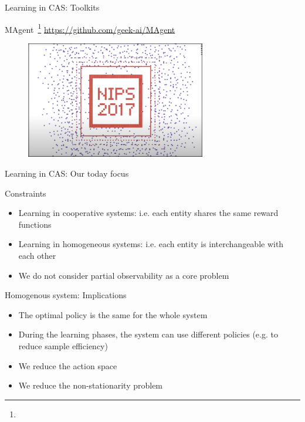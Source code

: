 \documentclass[presentation]{beamer}\mode<presentation>{\usetheme{AMSBolognaFC}}
\begin{document}
\begin{frame}{Learning in CAS: Toolkits}
	\begin{exampleblock}{MAgent~\footnote[frame]{} \url{https://github.com/geek-ai/MAgent}}
		\begin{figure}
			\href{https://www.youtube.com/watch?v=HCSm0kVolqI}{\includegraphics[width=0.7\textwidth]{img/magent.png}}
		\end{figure}
	\end{exampleblock}
\end{frame}
\begin{frame}{Learning in CAS: Our today focus}
	\begin{alertblock}{Constraints}
		\begin{itemize}
			\item Learning in cooperative systems: i.e. each entity shares the same reward functions
			\item Learning in homogeneous systems: i.e. each entity is interchangeable with each other
			\item[\faExclamationTriangle] We do not consider partial observability as a core problem
		\end{itemize}
	\end{alertblock}
	\begin{exampleblock}{Homogenous system: Implications}
		\begin{itemize}
			\item[{\color{teal}\faThumbsUp}] The optimal policy is the same for the whole system
			\item[{\color{teal}\faThumbsUp}] During the learning phases, the system can use different policies (e.g. to reduce sample efficiency)
			\item[{\color{teal}\faThumbsUp}] We reduce the action space
			\item[{\color{teal}\faThumbsUp}] We reduce the non-stationarity problem
		\end{itemize}
	\end{exampleblock}
\end{frame}
\end{document}
